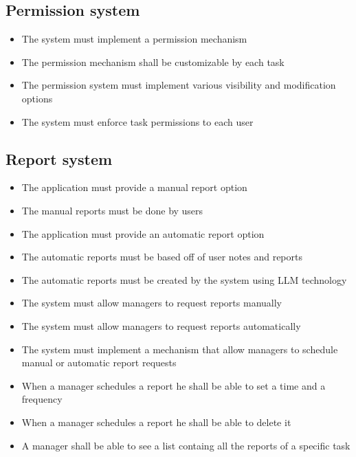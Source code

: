 \documentclass{article}
\begin{document}
\subsection{Permission system}
\begin{itemize}
    \item The system must implement a permission mechanism
    \item The permission mechanism shall be customizable by each task
    \item The permission system must implement various visibility and modification options
    \item The system must enforce task permissions to each user
\end{itemize}
\subsection{Report system}
\begin{itemize}
    \item The application must provide a manual report option
    \item The manual reports must be done by users
    \item The application must provide an automatic report option
    \item The automatic reports must be based off of user notes and reports
    \item The automatic reports must be created by the system using LLM technology
    \item The system must allow managers to request reports manually
    \item The system must allow managers to request reports automatically
    \item The system must implement a mechanism that allow managers to schedule manual or automatic report requests
    \item When a manager schedules a report he shall be able to set a time and a frequency
    \item When a manager schedules a report he shall be able to delete it
    \item A manager shall be able to see a list containg all the reports of a specific task
\end{itemize}
\end{document}
